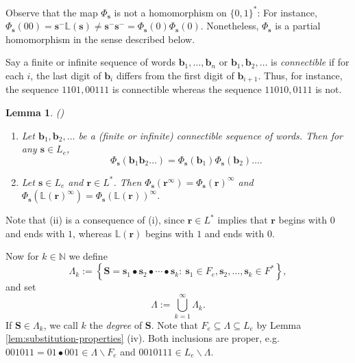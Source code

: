 \documentclass[11pt]{amsart}
\newtheorem{lemma}[theorem]{Lemma}
\theoremstyle{definition}
\theoremstyle{remark}
\numberwithin{equation}{section}
\newcommand{\N}{\ensuremath{\mathbb{N}}}
\renewcommand{\L}{\ensuremath{\mathbb{L}}}
\newcommand{\F}{F^*}
\newcommand{\LL}{L^*}
\renewcommand{\b}{ {\mathbf{b}}}
\newcommand{\s}{ {\mathbf{s}}}
\newcommand{\cs}{ {\mathbf{S}}}
\renewcommand{\r}{ {\mathbf{r}}}
\newcommand{\set}[1]{\left\{#1\right\}}
\newcommand{\f}{\infty}
\newcommand{\La}{\Lambda}
\begin{document}
Observe that the map $\Phi_\s$ is not a homomorphism on $\{0,1\}^*$: For instance, $\Phi_\s(00)=\s^-\L(\s)\neq \s^-\s^-=\Phi_\s(0)\Phi_\s(0)$. Nonetheless, $\Phi_\s$ is a partial homomorphism in the sense described below.

Say a finite or infinite sequence of words $\b_1,\dots, \b_n$ or $\b_1,\b_2,\dots$ is {\em connectible} if for each $i$, the last digit of $\b_i$ differs from the first digit of $\b_{i+1}$. Thus, for instance, the sequence $1101, 00111$ is connectible whereas the sequence $11010, 0111$ is not. %

\begin{lemma} \label{lem:connectible}
{\rm (\cite[Section 3]{Allaart-Kong-2021})}
\begin{enumerate}[{\rm (i)}]
\item Let $\b_1,\b_2,\dots$ be a (finite or infinite) connectible sequence of words. Then for any $\s\in {L_e}$,
\[
\Phi_\s(\b_1\b_2\dots)=\Phi_\s(\b_1)\Phi_\s(\b_2)\dots.
\]
\item Let {$\s\in L_e$ and} $\r\in\LL$. Then $\Phi_\s(\r^\f)=\Phi_\s(\r)^\f$ and $\Phi_\s(\L(\r)^\f)=\Phi_\s(\L(\r))^\f$.
\end{enumerate}
\end{lemma}

{Note that (ii) is a consequence of (i), since $\r\in\LL$ implies that $\r$ begins with $0$ and ends with $1$, whereas $\L(\r)$ begins with $1$ and ends with $0$.}

Now for $k\in\N$ we define
\begin{equation} \label{eq:set-substitution-Farey-words}
\La_k:=\set{\cs=\s_1\bullet\s_2\bullet\cdots\bullet\s_k:\ {\s_1\in F_e, \s_2,\dots,\s_k\in\F}},
\end{equation}
and set
\[
\La:=\bigcup_{k=1}^\f \La_k.
\]
If $\cs\in\La_k$, we call $k$ the {\em degree} of $\cs$. Note that $F_e\subseteq\La\subseteq L_e$ by Lemma \ref{lem:substitution-properties} (iv). Both inclusions are proper, e.g. $001011=01\bullet 001\in\La\backslash F_e$ and $0010111\in L_e\backslash\La$.
\end{document}
